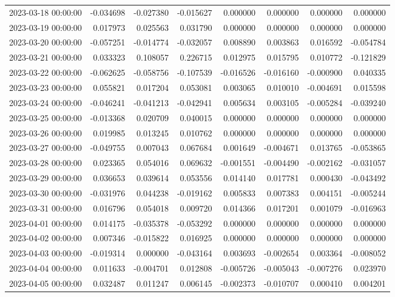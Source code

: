 \begin{tabular}{lrrrrrrr}
2023-03-18 00:00:00 & -0.034698 & -0.027380 & -0.015627 & 0.000000 & 0.000000 & 0.000000 & 0.000000 \\
2023-03-19 00:00:00 & 0.017973 & 0.025563 & 0.031790 & 0.000000 & 0.000000 & 0.000000 & 0.000000 \\
2023-03-20 00:00:00 & -0.057251 & -0.014774 & -0.032057 & 0.008890 & 0.003863 & 0.016592 & -0.054784 \\
2023-03-21 00:00:00 & 0.033323 & 0.108057 & 0.226715 & 0.012975 & 0.015795 & 0.010772 & -0.121829 \\
2023-03-22 00:00:00 & -0.062625 & -0.058756 & -0.107539 & -0.016526 & -0.016160 & -0.000900 & 0.040335 \\
2023-03-23 00:00:00 & 0.055821 & 0.017204 & 0.053081 & 0.003065 & 0.010010 & -0.004691 & 0.015598 \\
2023-03-24 00:00:00 & -0.046241 & -0.041213 & -0.042941 & 0.005634 & 0.003105 & -0.005284 & -0.039240 \\
2023-03-25 00:00:00 & -0.013368 & 0.020709 & 0.040015 & 0.000000 & 0.000000 & 0.000000 & 0.000000 \\
2023-03-26 00:00:00 & 0.019985 & 0.013245 & 0.010762 & 0.000000 & 0.000000 & 0.000000 & 0.000000 \\
2023-03-27 00:00:00 & -0.049755 & 0.007043 & 0.067684 & 0.001649 & -0.004671 & 0.013765 & -0.053865 \\
2023-03-28 00:00:00 & 0.023365 & 0.054016 & 0.069632 & -0.001551 & -0.004490 & -0.002162 & -0.031057 \\
2023-03-29 00:00:00 & 0.036653 & 0.039614 & 0.053556 & 0.014140 & 0.017781 & 0.000430 & -0.043492 \\
2023-03-30 00:00:00 & -0.031976 & 0.044238 & -0.019162 & 0.005833 & 0.007383 & 0.004151 & -0.005244 \\
2023-03-31 00:00:00 & 0.016796 & 0.054018 & 0.009720 & 0.014366 & 0.017201 & 0.001079 & -0.016963 \\
2023-04-01 00:00:00 & 0.014175 & -0.035378 & -0.053292 & 0.000000 & 0.000000 & 0.000000 & 0.000000 \\
2023-04-02 00:00:00 & 0.007346 & -0.015822 & 0.016925 & 0.000000 & 0.000000 & 0.000000 & 0.000000 \\
2023-04-03 00:00:00 & -0.019314 & 0.000000 & -0.043164 & 0.003693 & -0.002654 & 0.003364 & -0.008052 \\
2023-04-04 00:00:00 & 0.011633 & -0.004701 & 0.012808 & -0.005726 & -0.005043 & -0.007276 & 0.023970 \\
2023-04-05 00:00:00 & 0.032487 & 0.011247 & 0.006145 & -0.002373 & -0.010707 & 0.000410 & 0.004201 \\

\end{tabular}
